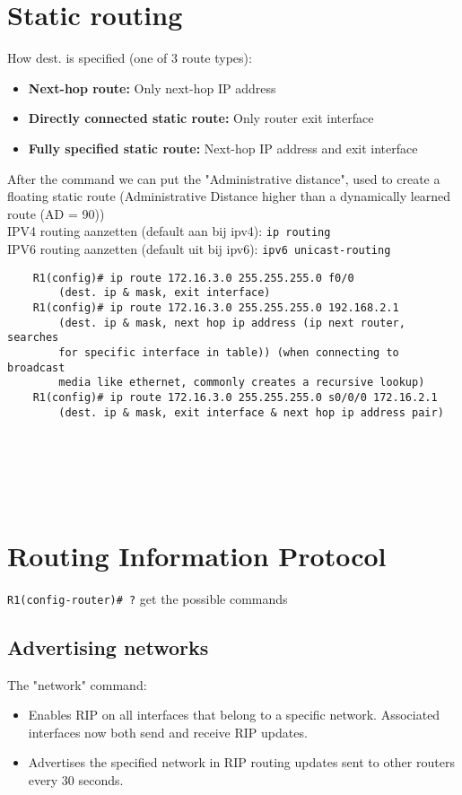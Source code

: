\documentclass[10pt, a4paper]{article}
\begin{document}
	\section{Static routing}
	How dest. is specified (one of 3 route types):
	\begin{itemize}[noitemsep,nolistsep]
		\item \textbf{Next-hop route:} Only next-hop IP address
		\item \textbf{Directly connected static route:} Only router exit interface
		\item \textbf{Fully specified static route:} Next-hop IP address and exit interface\\
	\end{itemize}
	After the command we can put the "Administrative distance", used to create a floating static route (Administrative Distance higher than a dynamically learned route (AD = 90))\\
	IPV4 routing aanzetten (default aan bij ipv4): \texttt{ip routing}\\
	IPV6 routing aanzetten (default uit bij ipv6): \texttt{ipv6 unicast-routing}\\
	\begin{lstlisting}
	R1(config)# ip route 172.16.3.0 255.255.255.0 f0/0
		(dest. ip & mask, exit interface)
	R1(config)# ip route 172.16.3.0 255.255.255.0 192.168.2.1
		(dest. ip & mask, next hop ip address (ip next router, searches
		for specific interface in table)) (when connecting to broadcast
		media like ethernet, commonly creates a recursive lookup)
	R1(config)# ip route 172.16.3.0 255.255.255.0 s0/0/0 172.16.2.1
		(dest. ip & mask, exit interface & next hop ip address pair)
	\end{lstlisting}
	\ \\ \\ \\ \\

	\section{Routing Information Protocol}
	\texttt{R1(config-router)\# ?} get the possible commands
	\subsection{Advertising networks}
	The "network" command:
	\begin{itemize}[noitemsep,nolistsep]
		\item Enables RIP on all interfaces that belong to a specific network. Associated interfaces now both send and receive RIP updates.
		\item Advertises the specified network in RIP routing updates sent to other routers every 30 seconds.\\
	\end{itemize}
\end{document}
